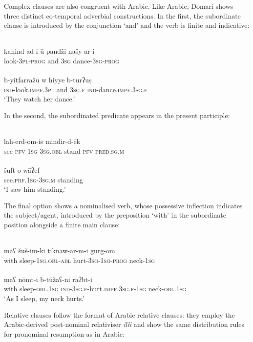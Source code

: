\documentclass[output=paper]{langsci/langscibook}
\begin{document}
Complex clauses are also congruent with Arabic. Like Arabic, Domari shows three distinct co-temporal adverbial constructions. In the first, the subordinate clause is introduced by the conjunction ‘and’ and the verb is finite and indicative:

\ea\label{ex:matras:}
\ea
{}\\
\gll kahind-ad-i ū pandži našy-ar-i  \\
     look-\textsc{3pl-prog} and \textsc{3sg} dance-\textsc{3sg-prog}\\
     
\ex {}\\
\gll b-yitfarražu w hiyye b-turʔuṣ  \\
     \textsc{ind}-look.\textsc{impf.3pl} and \textsc{3sg.f} \textsc{ind}-dance.\textsc{impf.3sg.f}\\
\glt ‘They watch her dance.’
\z
\z

In the second, the subordinated predicate appears in the present participle:

\ea\label{ex:matras:}
\ea
{}\\
\gll lah-erd-om-is mindir-d-ēk    \\
       see-\textsc{pfv-1sg-3sg.obl} stand-\textsc{pfv-pred.sg.m}\\
       
\ex
{}\\
\gll šuft-o   wāʔef    \\
     see.\textsc{prf.1sg-3sg.m} standing\\
\glt ‘I saw him standing.’
\z
\z

The final option shows a nominalised verb, whose possessive inflection indicates the subject/agent, introduced by the preposition ‘with’ in the subordinate position alongside a finite main clause:

\ea\label{ex:matras:}
\ea
{}\\
\gll maʕ šuš-im-ki tiknaw-ar-m-i gurg-om  \\
       with sleep-\textsc{1sg.obl-abl} hurt-\textsc{3sg-1sg-prog} neck-1\textsc{sg}\\
\ex
{}\\
\gll maʕ nōmt-i b-tūžaʕ-ni raʔbt-i  \\
       with sleep-\textsc{obl.1sg} \textsc{ind-3sg.f}-hurt.\textsc{impf.3sg.f-1sg} neck-\textsc{obl.1sg}\\
\glt       ‘As I sleep, my neck hurts.’
\z
\z

Relative clauses follow the format of Arabic relative clauses: they employ the Arabic-derived post-nominal relativiser \textit{illi} and show the same distribution rules for pronominal resumption as in Arabic:
\end{document}
